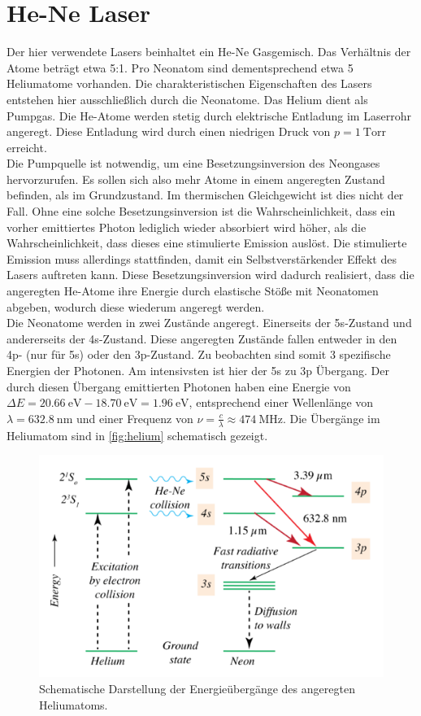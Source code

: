 \section{He-Ne Laser}

Der hier verwendete Lasers beinhaltet ein He-Ne Gasgemisch. Das Verhältnis der Atome beträgt etwa 5:1. Pro
Neonatom sind dementsprechend etwa 5 Heliumatome vorhanden. Die charakteristischen Eigenschaften des Lasers entstehen hier ausschließlich
durch die Neonatome. Das Helium dient als Pumpgas. Die He-Atome werden stetig durch elektrische Entladung im Laserrohr angeregt.
Diese Entladung wird durch einen niedrigen Druck von $p = \qty{1}{\mathrm{Torr}}$ erreicht.\\
Die Pumpquelle ist notwendig, um eine Besetzungsinversion des Neongases hervorzurufen. Es sollen sich also mehr Atome in einem angeregten
Zustand befinden, als im Grundzustand. Im thermischen Gleichgewicht ist dies nicht der Fall. Ohne eine solche Besetzungsinversion ist die Wahrscheinlichkeit, dass ein vorher emittiertes
Photon lediglich wieder absorbiert wird höher, als die Wahrscheinlichkeit, dass dieses eine stimulierte Emission auslöst. Die stimulierte
Emission muss allerdings stattfinden, damit ein Selbstverstärkender Effekt des Lasers auftreten kann.
Diese Besetzungsinversion wird dadurch realisiert, dass die angeregten He-Atome ihre Energie durch elastische Stöße mit Neonatomen abgeben,
wodurch diese wiederum angeregt werden. \\
Die Neonatome werden in zwei Zustände angeregt. Einerseits der 5s-Zustand und andererseits der 4s-Zustand. Diese angeregten
Zustände fallen entweder in den 4p- (nur für 5s) oder den 3p-Zustand. Zu beobachten sind somit 3 spezifische Energien der Photonen.
Am intensivsten ist hier der 5s zu 3p Übergang. Der durch diesen Übergang emittierten Photonen haben eine Energie von 
$\Delta E = \qty{20.66}{\electronvolt} - \qty{18.70}{\electronvolt} = \qty{1.96}{\electronvolt}$, entsprechend einer 
Wellenlänge von $\lambda = \qty{632.8}{\nano\metre}$ und einer Frequenz von $\nu = \frac{c}{\lambda} \approx \qty{474}{\mega\hertz}$.
Die Übergänge im Heliumatom sind in \autoref{fig:helium} schematisch gezeigt.
\begin{figure}
    \centering
    \includegraphics[width = \textwidth]{v61_bilder/helium.png}
    \caption{Schematische Darstellung der Energieübergänge des angeregten Heliumatoms.}
    \label{fig:helium}
\end{figure}


